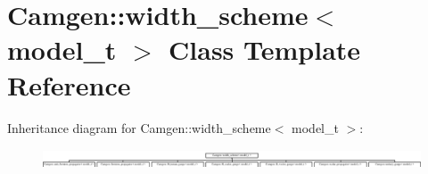 \hypertarget{a00578}{\section{Camgen\-:\-:width\-\_\-scheme$<$ model\-\_\-t $>$ Class Template Reference}
\label{a00578}
}
Inheritance diagram for Camgen\-:\-:width\-\_\-scheme$<$ model\-\_\-t $>$\-:\begin{figure}[H]
\begin{center}
\leavevmode
\includegraphics[height=0.577617cm]{a00578}
\end{center}
\end{figure}
